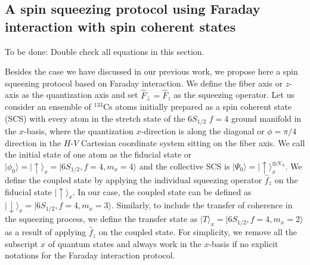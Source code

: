 \documentclass[pra,twocolumn,floatfix,superscriptaddress]{revtex4-1} %
\def\ket#1{\lvert{#1}\rangle}%
\newcommand{\comment}[1]{{\color{Maroon} #1}}
\begin{document}
\subsection{A spin squeezing protocol using Faraday interaction with spin coherent states}
\comment{To be done: Double check all equations in this section.}

Besides the case we have discussed in our previous work, we propose here a spin squeezing protocol based on Faraday interaction.
We define the fiber axis or $ z $-axis as the quantization axis and set $ \hat{F}_\perp=\hat{F}_z $ as the squeezing operator. 
Let us consider an ensemble of $ ^{133} $Cs atoms initially prepared as a spin coherent state (SCS) with every atom in the stretch state of the $ 6S_{1/2}$ $f=4 $ ground manifold in the $ x $-basis, where the quantization $ x $-direction is along the diagonal or $ \phi=\pi/4 $ direction in the $ H $-$ V $ Cartesian coordinate system sitting on the fiber axis.
We call the initial state of one atom as the fiducial state or $ \ket{\phi_0}=\ket{\uparrow}_x = \ket{6S_{1/2},f=4,m_x=4} $ and the collective SCS is $ \ket{\Psi_0}=\ket{\uparrow}_x^{\otimes N_A} $.
We define the coupled state by applying the individual squeezing operator $ \hat{f}_z$ on the fiducial state $\ket{\uparrow}_x $.
In our case, the coupled state can be defined as $ \ket{\downarrow}_x=\ket{6S_{1/2},f=4,m_x=3} $.
Similarly, to include the transfer of coherence in the squeezing process, we define the transfer state as $ \ket{T}_x=\ket{6S_{1/2},f=4,m_x=2} $ as a result of applying $ \hat{f}_z$ on the coupled state. 
For simplicity, we remove all the subscript $ x $ of quantum states and always work in the $ x $-basis if no explicit notations for the Faraday interaction protocol. 
\end{document}

